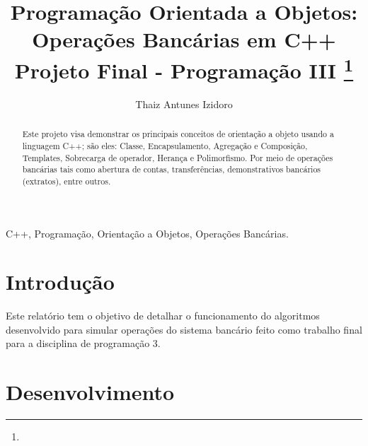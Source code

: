 \documentclass[conference]{IEEEtran}
\begin{document}
\title{Programação Orientada a Objetos: Operações Bancárias em C++\\
{\footnotesize Projeto Final - Programação III}
\thanks{}
}


\author{
\and
{Thaiz Antunes Izidoro}\\
}


\maketitle

\begin{abstract}
    Este projeto visa demonstrar os principais conceitos de orientação a objeto usando a linguagem C++; são eles: Classe, Encapsulamento, Agregação e Composição, Templates, Sobrecarga de operador, Herança e Polimorfismo. Por meio  de operações bancárias tais como abertura de contas, transferências, demonstrativos bancários (extratos), entre outros. 
\end{abstract}

\begin{IEEEkeywords}
    C++, Programação, Orientação a Objetos, Operações Bancárias.
\end{IEEEkeywords}

\section{Introdução}
Este relatório tem o objetivo de detalhar o funcionamento
do algoritmos desenvolvido para simular operações do sistema bancário feito como trabalho final para a disciplina de programação 3.

\section{Desenvolvimento}
\end{document}
